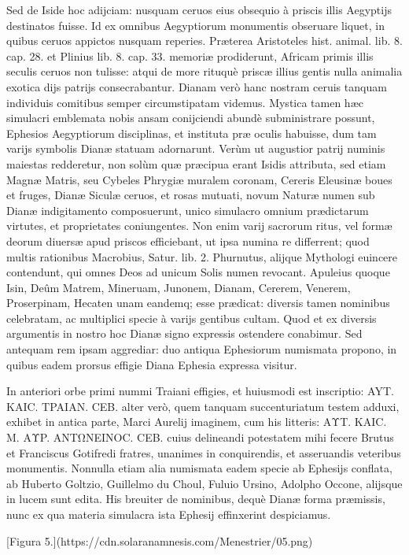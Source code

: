 \documentclass[a4paper, 11pt, oneside, polutonikogreek, latin]{article}
\begin{document}
Sed de Iside hoc adijciam: nusquam ceruos eius obsequio à priscis illis Aegyptijs destinatos fuisse. Id ex omnibus Aegyptiorum monumentis obseruare liquet, in quibus ceruos appictos nusquam reperies. Præterea Aristoteles hist. animal. lib. 8. cap. 28. et Plinius lib. 8. cap. 33. memoriæ prodiderunt, Africam primis illis seculis ceruos non tulisse: atqui de more rituquè priscæ illius gentis nulla animalia exotica dijs patrijs consecrabantur. Dianam verò hanc nostram ceruis tanquam individuis comitibus semper circumstipatam videmus. Mystica tamen hæc simulacri emblemata nobis ansam conijciendi abundè subministrare possunt, Ephesios Aegyptiorum disciplinas, et instituta præ oculis habuisse, dum tam varijs symbolis Dianæ statuam adornarunt. Verùm ut augustior patrij numinis maiestas redderetur, non solùm quæ præcipua erant Isidis attributa, sed etiam Magnæ Matris, seu Cybeles Phrygiæ muralem coronam, Cereris Eleusinæ boues et fruges, Dianæ Siculæ ceruos, et rosas mutuati, novum Naturæ numen sub Dianæ indigitamento composuerunt, unico simulacro omnium prædictarum virtutes, et proprietates coniungentes. Non enim varij sacrorum ritus, vel formæ deorum diuersæ apud priscos efficiebant, ut ipsa numina re differrent; quod multis rationibus Macrobius, Satur. lib. 2. Phurnutus, alijque Mythologi euincere contendunt, qui omnes Deos ad unicum Solis numen revocant. Apuleius quoque Isin, Deûm Matrem, Mineruam, Junonem, Dianam, Cererem, Venerem, Proserpinam, Hecaten unam eandemq; esse prædicat: diversis tamen nominibus celebratam, ac multiplici specie à varijs gentibus cultam. Quod et ex diversis argumentis in nostro hoc Dianæ signo expressis ostendere conabimur. Sed antequam rem ipsam aggrediar: duo antiqua Ephesiorum numismata propono, in quibus eadem prorsus effigie Diana Ephesia expressa visitur.

In anteriori orbe primi nummi Traiani effigies, et huiusmodi est inscriptio: AYT. KAIC. TPAIAN. CEB. alter verò, quem tanquam succenturiatum testem adduxi, exhibet in antica parte, Marci Aurelij imaginem, cum his litteris: AΥT. KAIC. M. AΥP. ANTΩNEINOC. CEB. cuius delineandi potestatem mihi fecere Brutus et Franciscus Gotifredi fratres, unanimes in conquirendis, et asseruandis veteribus monumentis. Nonnulla etiam alia numismata eadem specie ab Ephesijs conflata, ab Huberto Goltzio, Guillelmo du Choul, Fuluio Ursino, Adolpho Occone, alijsque in lucem sunt edita. His breuiter de nominibus, dequè Dianæ forma præmissis, nunc ex qua materia simulacra ista Ephesij effinxerint despiciamus.

[Figura 5.](https://cdn.solaranamnesis.com/Menestrier/05.png)
\clearpage
\end{document}
